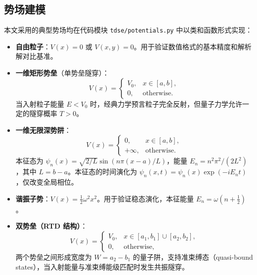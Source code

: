 \documentclass[12pt,a4paper]{article}
\begin{document}
\subsection{势场建模}

本文采用的典型势场均在代码模块 \texttt{tdse/potentials.py} 中以类和函数形式实现：

\begin{itemize}
    \item \textbf{自由粒子}：$V(x) = 0$ 或 $V(x,y) = 0$。用于验证数值格式的基本精度和解析解对比基准。

    \item \textbf{一维矩形势垒}（单势垒隧穿）：
    \begin{equation}
        V(x) =
        \begin{cases}
            V_0, & x \in [a, b], \\
            0,   & \text{otherwise}.
        \end{cases}
    \end{equation}
    当入射粒子能量 $E < V_0$ 时，经典力学预言粒子完全反射，但量子力学允许一定的隧穿概率 $T > 0$。

    \item \textbf{一维无限深势阱}：
    \begin{equation}
        V(x) =
        \begin{cases}
            0,      & x \in [a, b], \\
            +\infty, & \text{otherwise}.
        \end{cases}
    \end{equation}
    本征态为 $\psi_n(x) = \sqrt{2/L}\sin(n\pi(x-a)/L)$，能量 $E_n = n^2\pi^2/(2L^2)$，其中 $L = b-a$。本征态的时间演化为 $\psi_n(x,t) = \psi_n(x)\exp(-iE_nt)$，仅改变全局相位。

    \item \textbf{谐振子势}：$V(x) = \frac{1}{2}\omega^2 x^2$。用于验证稳态演化，本征能量 $E_n = \omega(n+\frac{1}{2})$。

    \item \textbf{双势垒（RTD 结构）}：
    \begin{equation}
        V(x) =
        \begin{cases}
            V_0, & x \in [a_1,b_1] \cup [a_2,b_2], \\
            0,   & \text{otherwise},
        \end{cases}
    \end{equation}
    两个势垒之间形成宽度为 $W = a_2 - b_1$ 的量子阱，支持准束缚态（quasi-bound states），当入射能量与准束缚能级匹配时发生共振隧穿。


\end{itemize}
\end{document}
